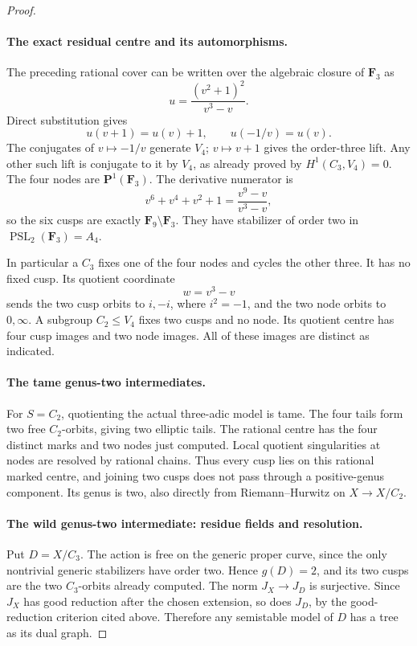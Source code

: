 \begin{proof}
\paragraph{The exact residual centre and its automorphisms.}
The preceding rational cover can be written over the algebraic
closure of \(\mathbf F_3\) as
\[
             u=\frac{(v^2+1)^2}{v^3-v}.
                                                               \tag{A.67.20}
\]
Direct substitution gives
\[
 u(v+1)=u(v)+1,\qquad u(-1/v)=u(v).
                                                               \tag{A.67.21}
\]
The conjugates of \(v\mapsto-1/v\) generate \(V_4\);
\(v\mapsto v+1\) gives the order-three lift. Any other such
lift is conjugate to it by \(V_4\), as already proved by
\(H^1(C_3,V_4)=0\). The four nodes are
\(\mathbf P^1(\mathbf F_3)\). The derivative numerator is
\[
 v^6+v^4+v^2+1=\frac{v^9-v}{v^3-v},
                                                               \tag{A.67.22}
\]
so the six cusps are exactly \(\mathbf F_9\setminus\mathbf F_3\).
They have stabilizer of order two in
\(\operatorname{PSL}_2(\mathbf F_3)=A_4\).

In particular a \(C_3\) fixes one of the four nodes and cycles
the other three. It has no fixed cusp. Its quotient coordinate
\[
                              w=v^3-v
                                                               \tag{A.67.23}
\]
sends the two cusp orbits to \(i,-i\), where \(i^2=-1\), and
the two node orbits to \(0,\infty\). A subgroup \(C_2\le V_4\)
fixes two cusps and no node. Its quotient centre has four
cusp images and two node images. All of these images are
distinct as indicated.

\paragraph{The tame genus-two intermediates.}
For \(S=C_2\), quotienting the actual three-adic model is tame.
The four tails form two free \(C_2\)-orbits, giving two elliptic
tails. The rational centre has the four distinct marks and
two nodes just computed. Local quotient singularities at
nodes are resolved by rational chains. Thus every cusp lies
on this rational marked centre, and joining two cusps does
not pass through a positive-genus component. Its genus is
two, also directly from Riemann--Hurwitz on \(X\to X/C_2\).

\paragraph{The wild genus-two intermediate: residue fields and resolution.}
Put \(D=X/C_3\). The action is free on the generic proper curve,
since the only nontrivial generic stabilizers have order two.
Hence \(g(D)=2\), and its two cusps are the two \(C_3\)-orbits
already computed. The norm \(J_X\to J_D\) is surjective. Since
\(J_X\) has good reduction after the chosen extension, so does
\(J_D\), by the good-reduction criterion cited above. Therefore
any semistable model of \(D\) has a tree as its dual graph.


\end{proof}
